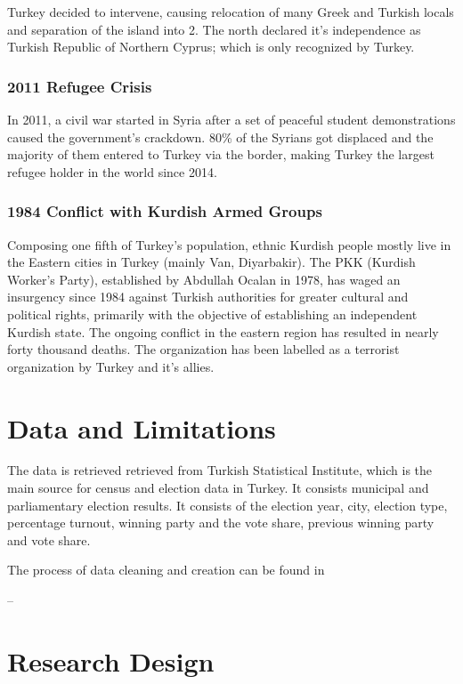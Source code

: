 \documentclass[12pt]{article}
\begin{document}
Turkey decided to intervene, causing relocation of many Greek and Turkish locals and separation of the island into 2. The north declared it's independence as Turkish Republic of Northern Cyprus; which is only recognized by Turkey. 

\subsubsection{2011 Refugee Crisis}

In 2011, a civil war started in Syria after a set of peaceful student demonstrations caused the government's crackdown. 80\% of the Syrians got displaced and the majority of them entered to Turkey via the border, making Turkey the largest refugee holder in the world since 2014. 

\subsubsection{1984 Conflict with Kurdish Armed Groups}

Composing one fifth of Turkey's population, ethnic Kurdish people mostly live in the Eastern cities in Turkey (mainly Van, Diyarbakir). The PKK (Kurdish Worker's Party), established by Abdullah Ocalan in 1978, has waged an insurgency since 1984 against Turkish authorities for greater cultural and political rights, primarily with the objective of establishing an independent Kurdish state. The ongoing conflict in the eastern region has resulted in nearly forty thousand deaths. The organization has been labelled as a terrorist organization by Turkey and it's allies. 


\section{Data and Limitations}

The data is retrieved retrieved from Turkish Statistical Institute, which is the main source for census and election data in Turkey. It consists municipal and parliamentary election results. It consists of the election year, city, election type, percentage turnout, winning party and the vote share, previous winning party and vote share. 

The process of data cleaning and creation can be found in 

--

\section{Research Design}
\end{document}
